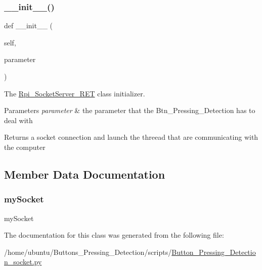 \subsubsection{\texorpdfstring{\+\_\+\+\_\+init\+\_\+\+\_\+()}{\_\_init\_\_()}}
{\footnotesize\ttfamily def \+\_\+\+\_\+init\+\_\+\+\_\+ (\begin{DoxyParamCaption}\item[{}]{self,  }\item[{}]{parameter }\end{DoxyParamCaption})}



The \hyperlink{a00049}{Rpi\+\_\+\+Socket\+Server\+\_\+\+R\+ET} class initializer. 


\begin{DoxyParams}{Parameters}
{\em parameter} & the parameter that the Btn\+\_\+\+Pressing\+\_\+\+Detection has to deal with \\
\hline
\end{DoxyParams}
\begin{DoxyReturn}{Returns}
a socket connection and launch the threead that are communicating with the computer 
\end{DoxyReturn}


\subsection{Member Data Documentation}
\mbox{\label{a00049_ab4dca4dc93d7a4919b7881c73ba5ab1e}} 
\subsubsection{\texorpdfstring{my\+Socket}{mySocket}}
{\footnotesize\ttfamily my\+Socket}



The documentation for this class was generated from the following file\+:\begin{DoxyCompactItemize}
\item 
/home/ubuntu/\+Buttons\+\_\+\+Pressing\+\_\+\+Detection/scripts/\hyperlink{a00014}{Button\+\_\+\+Pressing\+\_\+\+Detection\+\_\+socket.\+py}\end{DoxyCompactItemize}
